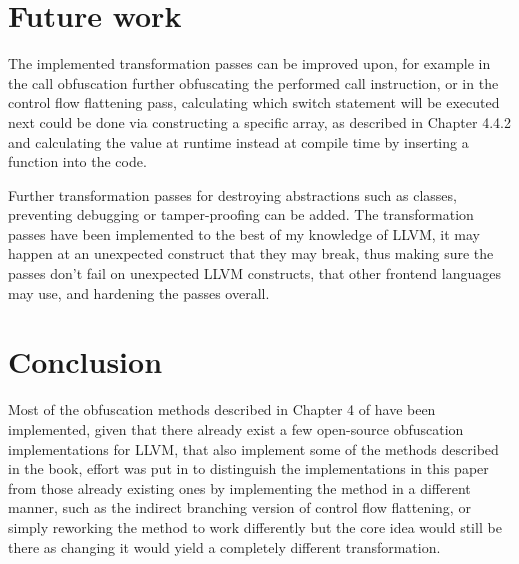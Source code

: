 \section{Future work}

The implemented transformation passes can be improved upon, for example in the call obfuscation further obfuscating
the performed call instruction, or in the control flow flattening pass, calculating which switch statement will be executed
next could be done via constructing a specific array, as described in Chapter 4.4.2 \cite{ss-chpt4} and calculating the value at runtime instead at compile time by
inserting a function into the code.

Further transformation passes for destroying abstractions such as classes, preventing debugging or tamper-proofing can be added.
The transformation passes have been implemented to the best of my knowledge of LLVM, it may happen at an unexpected construct that they may break, thus
making sure the passes don't fail on unexpected LLVM constructs, that other frontend languages may use, and hardening the passes overall.

\section{Conclusion}
Most of the obfuscation methods described in Chapter 4 of \cite{serr-soft} have been implemented, given that there already exist a few open-source obfuscation implementations
for LLVM, that also implement some of the methods described in the book, effort was put in to distinguish the implementations in this paper from those already existing ones
by implementing the method in a different manner, such as the indirect branching version of control flow flattening, or simply reworking the method to work differently but the
core idea would still be there as changing it would yield a completely different transformation.

